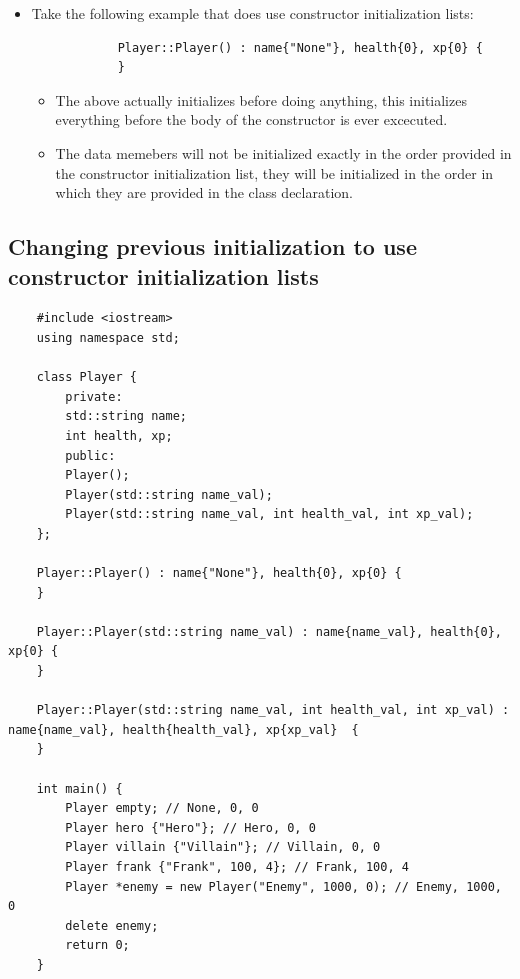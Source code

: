 \begin{itemize}
    \item Take the following example that does use constructor initialization lists:
        \begin{verbatim}
            Player::Player() : name{"None"}, health{0}, xp{0} {
            }
        \end{verbatim}
        \begin{itemize}
            \item The above actually initializes before doing anything, this initializes everything before the body of the constructor is ever excecuted.
            \item The data memebers will not be initialized exactly in the order provided in the constructor initialization list, they will be initialized in the order in which they are provided in the class declaration.
        \end{itemize}
\end{itemize}

\subsection{Changing previous initialization to use constructor initialization lists}
\begin{verbatim}
    #include <iostream>
    using namespace std;

    class Player {
        private:
        std::string name;
        int health, xp;
        public:
        Player();
        Player(std::string name_val);
        Player(std::string name_val, int health_val, int xp_val);
    };

    Player::Player() : name{"None"}, health{0}, xp{0} {
    }

    Player::Player(std::string name_val) : name{name_val}, health{0}, xp{0} {
    }

    Player::Player(std::string name_val, int health_val, int xp_val) : name{name_val}, health{health_val}, xp{xp_val}  {
    }

    int main() {
        Player empty; // None, 0, 0
        Player hero {"Hero"}; // Hero, 0, 0
        Player villain {"Villain"}; // Villain, 0, 0
        Player frank {"Frank", 100, 4}; // Frank, 100, 4
        Player *enemy = new Player("Enemy", 1000, 0); // Enemy, 1000, 0
        delete enemy;
        return 0;
    }
\end{verbatim}



